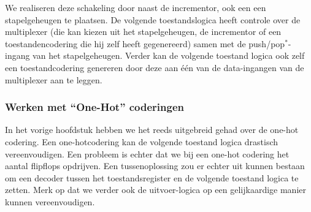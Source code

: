 We realiseren deze schakeling door naast de incrementor, ook een een stapelgeheugen te plaatsen. De volgende toestandslogica heeft controle over de multiplexer (die kan kiezen uit het stapelgeheugen, de incrementor of een toestandencodering die hij zelf heeft gegenereerd) samen met de push/pop$^*$-ingang van het stapelgeheugen. Verder kan de volgende toestand logica ook zelf een toestandcodering genereren door deze aan \'e\'en van de data-ingangen van de multiplexer aan te leggen.
\subsubsection{Werken met ``One-Hot'' coderingen}
In het vorige hoofdstuk hebben we het reeds uitgebreid gehad over de one-hot codering. Een one-hotcodering kan de volgende toestand logica drastisch vereenvoudigen. Een probleem is echter dat we bij een one-hot codering het aantal flipflops opdrijven. Een tussenoplossing zou er echter uit kunnen bestaan om een decoder tussen het toestandsregister en de volgende toestand logica te zetten. Merk op dat we verder ook de uitvoer-logica op een gelijkaardige manier kunnen vereenvoudigen.

